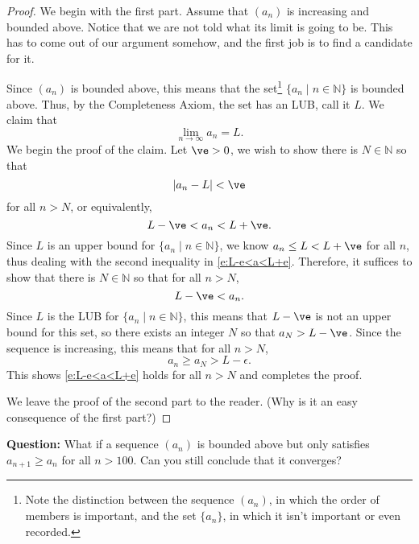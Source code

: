 \documentclass[11pt,dvipsnames]{book}
\numberwithin{figure}{section} %
\numberwithin{table}{section} %
\begin{document}
\begin{proof}
We begin with the first part. Assume that $(a_n)$ is increasing and bounded above. Notice that we are not told what its limit is going to be. This has to come out of our argument somehow, and the first job is to find a candidate for it.

Since $(a_{n})$ is bounded above, this means that the set\footnote{Note the distinction between the sequence $(a_n)$, in which the order of members is important, and the set $\{ a_n\}$, in which it isn't important or even recorded.} $\{a_{n}\; | \; n\in\mathbb{N}\}$ is bounded above. Thus, by the Completeness Axiom, the set has an LUB, call it $L$. We claim that
\[
\lim_{n\rightarrow\infty}a_{n}=L.
\]
We begin the proof of the claim. Let $\ve>0$, we wish to show there is $N\in\mathbb{N}$ so that
\[
|a_{n}-L|<\ve
\]
for all $n> N$, or equivalently,
\begin{equation}
\label{e:L-e<a<L+e}
L-\ve<a_{n}<L+\ve.
\end{equation}
Since $L$ is an upper bound for $\{a_{n}\; | \; n\in\mathbb{N}\}$, we know $a_{n}\leq L<L+\ve$ for all $n$, thus dealing with the second inequality in \eqref{e:L-e<a<L+e}. Therefore, it suffices to show that there is $N\in\mathbb{N}$ so that for all $n> N$,
\[
L-\ve<a_{n}.
\]
Since $L$ is the LUB for $\{a_{n}\; | \; n\in\mathbb{N}\}$, this means that $L-\ve$ is not an upper bound for this set, so there exists an integer $N$ so that $a_{N}>L-\ve$. Since the sequence is increasing, this means that for all $n> N$,
\[
a_{n} \geq a_N > L - \epsilon.
\]
This shows \eqref{e:L-e<a<L+e} holds for all $n>N$ and completes the proof.

\medskip
We leave the proof of the second part to the reader. (Why is it an easy consequence of the first part?)
\end{proof}
\noindent
{\bf Question:} What if a sequence $(a_n)$ is bounded above but only satisfies $a_{n+1} \geq a_{n}$ for all $n > 100$. Can you still conclude that it converges?
\end{document}
